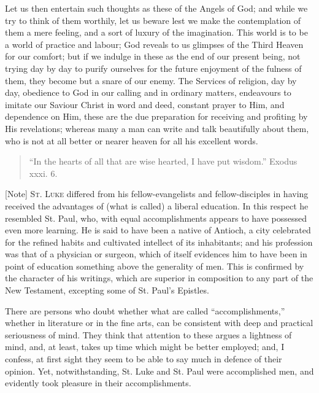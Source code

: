 Let us then entertain such thoughts as these of the Angels of God;
and while we try to think of them worthily, let us beware lest we make
the contemplation of them a mere feeling, and a sort of luxury of the
imagination. This world is to be a world of practice and labour; God
reveals to us glimpses of the Third Heaven for our comfort; but if we
indulge in these as the end of our present being, not trying day by day
to purify ourselves for the future enjoyment of the fulness of them,
they become but a snare of our enemy. The Services of religion, day by
day, obedience to God in our calling and in ordinary matters, endeavours
to imitate our Saviour Christ in word and deed, constant prayer to Him,
and dependence on Him, these are the due preparation for receiving and
profiting by His revelations; whereas many a man can write and talk
beautifully about them, who is not at all better or nearer heaven for
all his excellent words.


\begin{quote}

``In the hearts of all that are wise hearted, I have put
wisdom.'' Exodus xxxi. 6.

\end{quote}

[Note] S\textsc{t}.
L\textsc{uke} differed from his
fellow-evangelists and fellow-disciples in having received the
advantages of (what is called) a liberal education. In this respect he
resembled St. Paul, who, with equal accomplishments appears to have
possessed even more learning. He is said to have been a native of
Antioch, a city celebrated for the refined habits and cultivated
intellect of its inhabitants; and his profession was that of a physician
or surgeon, which of itself evidences him to have been in point of
education something above the generality of men. This is confirmed by
the character of his writings, which are superior in composition to any
part of the New Testament, excepting some of St. Paul's Epistles.

There are persons who doubt whether what are called
``accomplishments,'' whether in literature or in the fine arts,
can be consistent with deep and practical seriousness of mind. They
think that attention to these argues a lightness of mind, and, at least,
takes up time which might be better employed; and, I confess, at first
sight they seem to be able to say much in defence of their opinion. Yet,
notwithstanding, St. Luke and St. Paul were accomplished men, and
evidently took pleasure in their accomplishments.

